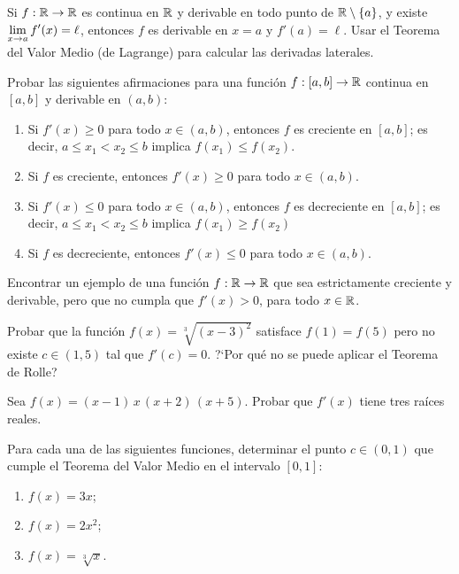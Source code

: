 \item * Si $f:\mathbb{R}\to\mathbb{R}$ es continua en $\mathbb{R}$ y derivable en todo punto de $\mathbb{R}\setminus\{a\}$, y existe $\displaystyle\lim_{x\to a}f'(x)= \ell$, entonces $f$ es derivable en $x=a$ y $f'(a) = \ell$.
Usar el Teorema del Valor Medio (de Lagrange) para calcular las derivadas laterales.

\item Probar las siguientes afirmaciones para una función $f:[a,b]\to \mathbb{R}$ continua en $[a,b]$ y derivable en $(a,b)$:
\begin{enumerate}
  \item Si $f'(x)\ge 0$ para todo $x\in(a,b)$, entonces $f$ es creciente en $[a,b]$; es decir, $a\le x_1<x_2\le b$ implica $f(x_1)\le f(x_2)$.
  \item Si $f$ es creciente, entonces $f'(x)\ge 0$ para todo $x\in(a,b)$.
  \item Si $f'(x)\le 0$ para todo $x\in(a,b)$, entonces $f$ es decreciente en $[a,b]$; es decir, $a\le x_1<x_2\le b$ implica $f(x_1)\ge f(x_2)$
  \item Si $f$ es decreciente, entonces $f'(x)\le 0$ para todo $x\in(a,b)$.
\end{enumerate}

\item Encontrar un ejemplo de una función $f:\mathbb{R}\to\mathbb{R}$ que sea estrictamente creciente y derivable, pero que no cumpla que $f'(x)>0$, para todo $x\in\mathbb{R}$.

\item Probar que la función $f(x)=\sqrt[3]{(x-3)^2}$ satisface $f(1)=f(5)$ pero no existe $c\in(1,5)$ tal que $f'(c)=0$. ?`Por qué no se puede aplicar el Teorema de Rolle?

\item Sea $f(x)=(x-1)\, x\, (x+2)\, (x+5)$. Probar que $f'(x)$ tiene tres raíces reales.

\item Para cada una de las siguientes funciones, determinar el punto $c\in(0,1)$ que cumple el Teorema del Valor Medio en el intervalo $[0,1]$:
\begin{multicols}{3}
  \begin{enumerate}
    \item $f(x)=3x$;
    \item $f(x)=2x^2$;
    \item $f(x)=\sqrt[3]{x}$.
  \end{enumerate}
\end{multicols}

